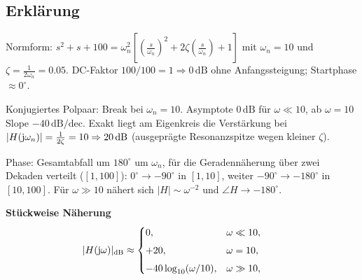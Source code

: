 \subsection{Erklärung}
\vspace{5mm}
\begin{description}[leftmargin=1.2em,labelsep=.6em,font=\bfseries]
\item[Schritt 1] Normform: $s^2+s+100=\omega_n^2\!\left[\left(\tfrac{s}{\omega_n}\right)^2+2\zeta\left(\tfrac{s}{\omega_n}\right)+1\right]$ mit $\omega_n=10$ und $\zeta=\tfrac{1}{2\omega_n}=0.05$. DC-Faktor $100/100=1\Rightarrow 0\,\mathrm{dB}$ ohne Anfangssteigung; Startphase $\approx0^\circ$.
\item[Schritt 2] Konjugiertes Polpaar: Break bei $\omega_n=10$. Asymptote $0\,\mathrm{dB}$ für $\omega\ll10$, ab $\omega=10$ Slope $-40\,\mathrm{dB/dec}$. Exakt liegt am Eigenkreis die Verstärkung bei $|H(\operatorname{j}\!\omega_n)|=\tfrac{1}{2\zeta}=10\Rightarrow20\,\mathrm{dB}$ (ausgeprägte Resonanzspitze wegen kleiner $\zeta$).
\item[Schritt 3] Phase: Gesamtabfall um $180^\circ$ um $\omega_n$, für die Geradennäherung über zwei Dekaden verteilt ($[1,100]$): $0^\circ\to-90^\circ$ in $[1,10]$, weiter $-90^\circ\to-180^\circ$ in $[10,100]$. Für $\omega\gg10$ nähert sich $|H|\sim \omega^{-2}$ und $\angle H\to-180^\circ$.
\end{description}

\vspace{0.5cm}
\medskip
\noindent\textbf{Stückweise Näherung}
\[
|H(\operatorname{j}\!\omega)|_{\mathrm{dB}}\approx
\begin{cases}
0,& \omega\ll10,\\[4pt]
+20,& \omega=10,\\[4pt]
-40\log_{10}(\omega/10),& \omega\gg10,
\end{cases}
\qquad
\]
\newpage
